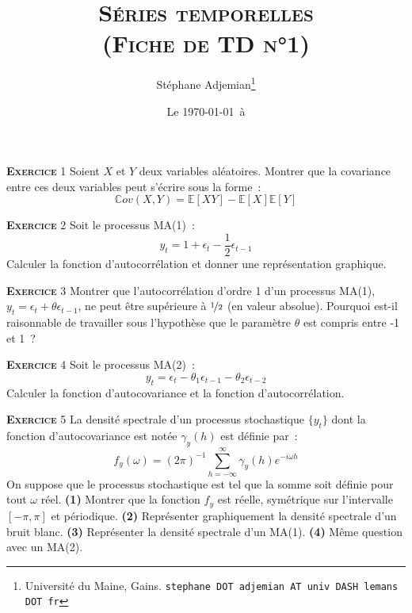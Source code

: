 \documentclass[10pt,a4paper,notitlepage]{article}
\newcommand{\exercice}[1]{\textsc{\textbf{Exercice}} #1}
\begin{document}
\title{\textsc{Séries temporelles\\ \small{(Fiche de TD n°1)}}}
\author{Stéphane Adjemian\thanks{Université du Maine, Gains. \texttt{stephane DOT adjemian AT univ DASH lemans DOT fr}}}
\date{Le \today\ à \thistime}

\maketitle

\exercice{1} Soient $X$ et $Y$ deux variables aléatoires. Montrer que la covariance entre ces deux variables peut s'écrire sous la forme :
\[
\mathbb Cov(X,Y) = \mathbb E [XY] - \mathbb E [X]\mathbb E [Y]
\]

\bigskip

\exercice{2} Soit le processus MA(1) :
\[
y_t = 1 + \epsilon_t - \frac{1}{2}\epsilon_{t-1}
\]
Calculer la fonction d'autocorrélation et donner une représentation graphique.

\bigskip

\exercice{3} Montrer que l'autocorrélation d'ordre 1 d'un processus MA(1), $y_t=\epsilon_t+\theta\epsilon_{t-1}$, ne peut être supérieure à $\nicefrac{1}{2}$ (en valeur absolue). Pourquoi est-il raisonnable de travailler sous l'hypothèse que le paramètre $\theta$ est compris entre -1 et 1 ?

\bigskip

\exercice{4} Soit le processus MA(2) :
\[
y_t = \epsilon_t - \theta_1\epsilon_{t-1} - \theta_2\epsilon_{t-2}
\]
Calculer la fonction d'autocovariance et la fonction d'autocorrélation.

\bigskip

\exercice{5} La densité spectrale d'un processus stochastique $\{y_t\}$ dont la fonction d'autocovariance est notée $\gamma_y (h)$ est définie par :
\[
f_y(\omega) = (2\pi)^{-1}\sum_{h=-\infty}^{\infty}\gamma_y(h)e^{-i \omega h}
\]
On suppose que le processus stochastique est tel que la somme soit définie pour tout $\omega$ réel. \textbf{(1)} Montrer que la fonction $f_y$ est réelle, symétrique sur l'intervalle $[-\pi,\pi]$ et périodique. \textbf{(2)} Représenter graphiquement la densité spectrale d'un bruit blanc. \textbf{(3)} Représenter la densité spectrale d'un MA(1). \textbf{(4)} Même question avec un MA(2).
\end{document}
